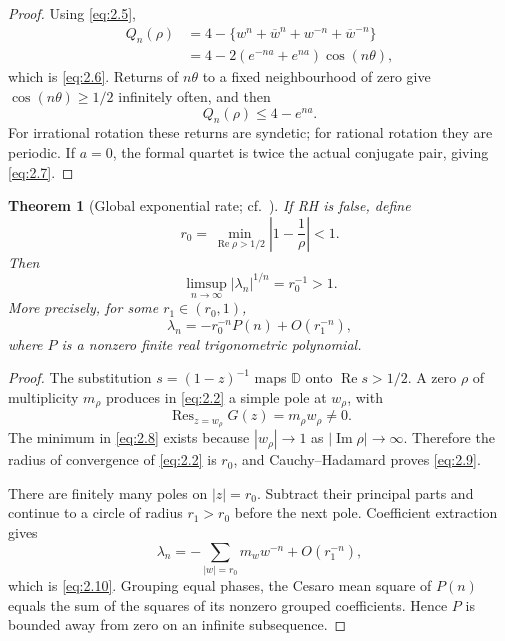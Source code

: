 \documentclass[11pt]{amsart}
\numberwithin{equation}{section}
\newtheorem{theorem}{Theorem}[section]
\theoremstyle{definition}
\theoremstyle{remark}
\renewcommand{\Re}{\operatorname{Re}}
\renewcommand{\Im}{\operatorname{Im}}
\DeclareMathOperator{\Res}{Res}
\begin{document}
\begin{proof}
Using \eqref{eq:2.5},
\[
\begin{aligned}
 Q_n(\rho)
 &=4-\{w^n+\overline w^n+w^{-n}+\overline w^{-n}\}\\
 &=4-2(e^{-na}+e^{na})\cos(n\theta),
\end{aligned}
\]
which is \eqref{eq:2.6}. Returns of \(n\theta\) to a fixed neighbourhood of zero
give \(\cos(n\theta)\ge1/2\) infinitely often, and then
\[
 Q_n(\rho)\le4-e^{na}.
\]
For irrational rotation these returns are syndetic; for rational rotation
they are periodic. If \(a=0\), the formal quartet is twice the actual
conjugate pair, giving \eqref{eq:2.7}.
\end{proof}

\begin{theorem}[Global exponential rate; cf.\ \cite{Li,BombieriLagarias}]
\label{thm:rate}
If RH is false, define
\begin{equation}
 r_0=\min_{\Re\rho>1/2}\left|1-\frac1\rho\right|<1.
                                                        \label{eq:2.8}
\end{equation}
Then
\begin{equation}
 \limsup_{n\to\infty}|\lambda_n|^{1/n}=r_0^{-1}>1.       \label{eq:2.9}
\end{equation}
More precisely, for some \(r_1\in(r_0,1)\),
\begin{equation}
 \lambda_n=-r_0^{-n}P(n)+O(r_1^{-n}),                   \label{eq:2.10}
\end{equation}
where \(P\) is a nonzero finite real trigonometric polynomial.
\end{theorem}

\begin{proof}
The substitution \(s=(1-z)^{-1}\) maps \(\mathbb D\) onto
\(\Re s>1/2\). A zero \(\rho\) of multiplicity \(m_\rho\) produces in
\eqref{eq:2.2} a simple pole at \(w_\rho\), with
\begin{equation}
 \Res_{z=w_\rho}G(z)=m_\rho w_\rho\ne0.                  \label{eq:2.11}
\end{equation}
The minimum in \eqref{eq:2.8} exists because \(|w_\rho|\to1\) as
\(|\Im\rho|\to\infty\). Therefore the radius of convergence of \eqref{eq:2.2}
is \(r_0\), and Cauchy--Hadamard proves \eqref{eq:2.9}.

There are finitely many poles on \(|z|=r_0\). Subtract their principal
parts and continue to a circle of radius \(r_1>r_0\) before the next pole.
Coefficient extraction gives
\[
 \lambda_n=-\sum_{|w|=r_0}m_ww^{-n}+O(r_1^{-n}),
\]
which is \eqref{eq:2.10}. Grouping equal phases, the Cesaro mean square of
\(P(n)\) equals the sum of the squares of its nonzero grouped coefficients.
Hence \(P\) is bounded away from zero on an infinite subsequence.
\end{proof}
\end{document}
